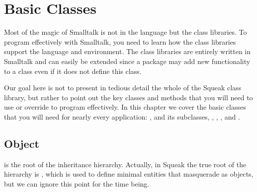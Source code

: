 \documentclass[a4paper,10pt,twoside]{book}
\begin{document}
	\renewcommand{\nnbb}[2]{} %
	\sloppy
\fi
\chapter{Basic Classes}
\label{cha:basic}

Most of the magic of Smalltalk is not in the language but the class libraries.
To program effectively with Smalltalk, you need to learn how the class libraries support the language and environment.
The class libraries are entirely written in Smalltalk and can easily be extended since a package may add new functionality to a class even if it does not define this class. 

Our goal here is not to present in tedious detail the whole of the Squeak class library, but rather to point out the key classes and methods that you will need to use or override to program effectively.
In this chapter we cover the basic classes that you will need for nearly every application: ,  and its subclasses, , , , and .


\section{Object}
 is the root of the inheritance hierarchy.
Actually, in Squeak the true root of the hierarchy is , which is used to define minimal entities that masquerade as objects, but we can ignore this point for the time being.
\end{document}

